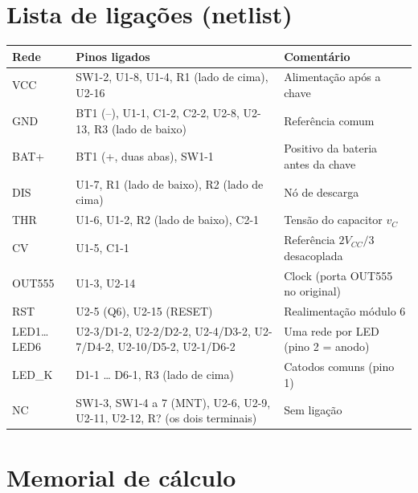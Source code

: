 \documentclass[11pt,a4paper]{article}
\begin{document}
\section{Lista de ligações (netlist)}
\begin{center}
\small
\begin{tabularx}{\linewidth}{@{}l Y L{6.2cm}@{}}
\toprule
\textbf{Rede} & \textbf{Pinos ligados} & \textbf{Comentário} \\
\midrule
\textcolor{redeVcc}{VCC} & SW1-2, U1-8, U1-4, R1 (lado de cima), U2-16 & Alimentação após a chave \\
GND & BT1 (–), U1-1, C1-2, C2-2, U2-8, U2-13, R3 (lado de baixo) & Referência comum \\
BAT+ & BT1 (+, duas abas), SW1-1 & Positivo da bateria antes da chave \\
DIS & U1-7, R1 (lado de baixo), R2 (lado de cima) & Nó de descarga \\
THR & U1-6, U1-2, R2 (lado de baixo), C2-1 & Tensão do capacitor $v_C$ \\
CV & U1-5, C1-1 & Referência $2V_{CC}/3$ desacoplada \\
\textcolor{petroleo}{OUT555} & U1-3, U2-14 & Clock (porta OUT555 no original) \\
\textcolor{douradoEsc}{RST} & U2-5 (Q6), U2-15 (RESET) & Realimentação módulo 6 \\
\textcolor{oliva}{LED1…LED6} & U2-3/D1-2, U2-2/D2-2, U2-4/D3-2, U2-7/D4-2, U2-10/D5-2, U2-1/D6-2 & Uma rede por LED (pino 2 = anodo) \\
LED\_K & D1-1 … D6-1, R3 (lado de cima) & Catodos comuns (pino 1) \\
\textcolor{cinzaNC}{NC} & SW1-3, SW1-4 a 7 (MNT), U2-6, U2-9, U2-11, U2-12, R? (os dois terminais) & Sem ligação \\
\bottomrule
\end{tabularx}
\end{center}

\section{Memorial de cálculo}
\end{document}
